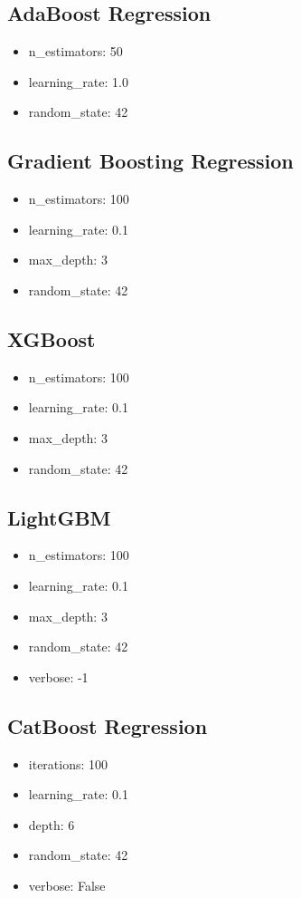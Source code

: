 \subsection{AdaBoost Regression}
\begin{itemize}
    \item n\_estimators: 50
    \item learning\_rate: 1.0
    \item random\_state: 42
\end{itemize}

\subsection{Gradient Boosting Regression}
\begin{itemize}
    \item n\_estimators: 100
    \item learning\_rate: 0.1
    \item max\_depth: 3
    \item random\_state: 42
\end{itemize}

\subsection{XGBoost}
\begin{itemize}
    \item n\_estimators: 100
    \item learning\_rate: 0.1
    \item max\_depth: 3
    \item random\_state: 42
\end{itemize}

\subsection{LightGBM}
\begin{itemize}
    \item n\_estimators: 100
    \item learning\_rate: 0.1
    \item max\_depth: 3
    \item random\_state: 42
    \item verbose: -1
\end{itemize}

\subsection{CatBoost Regression}
\begin{itemize}
    \item iterations: 100
    \item learning\_rate: 0.1
    \item depth: 6
    \item random\_state: 42
    \item verbose: False
\end{itemize}

